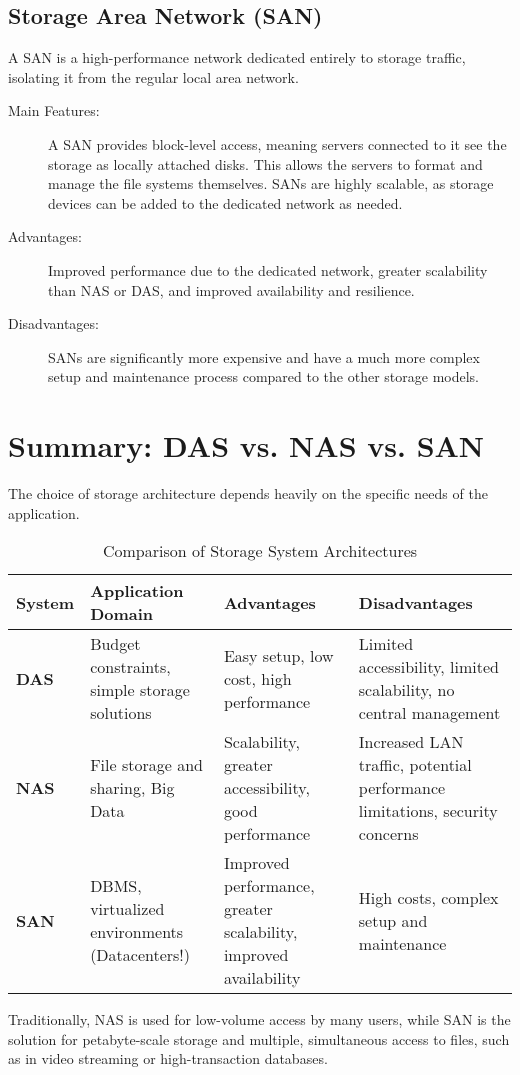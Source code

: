 \subsection{Storage Area Network (SAN)}
A SAN is a high-performance network dedicated entirely to storage traffic, isolating it from the regular local area network.
\begin{description}
    \item[Main Features:] A SAN provides block-level access, meaning servers connected to it see the storage as locally attached disks. This allows the servers to format and manage the file systems themselves. SANs are highly scalable, as storage devices can be added to the dedicated network as needed.
    \item[Advantages:] Improved performance due to the dedicated network, greater scalability than NAS or DAS, and improved availability and resilience.
    \item[Disadvantages:] SANs are significantly more expensive and have a much more complex setup and maintenance process compared to the other storage models.
\end{description}

\section{Summary: DAS vs. NAS vs. SAN}
The choice of storage architecture depends heavily on the specific needs of the application.

\begin{table}[h!]
    \centering
    \begin{tabular}{|p{}|p{}|p{}|p{}|}
        \hline
        \textbf{System} & \textbf{Application Domain} & \textbf{Advantages} & \textbf{Disadvantages} \\
        \hline
        \textbf{DAS} & Budget constraints, simple storage solutions & Easy setup, low cost, high performance & Limited accessibility, limited scalability, no central management \\
        \hline
        \textbf{NAS} & File storage and sharing, Big Data & Scalability, greater accessibility, good performance & Increased LAN traffic, potential performance limitations, security concerns \\
        \hline
        \textbf{SAN} & DBMS, virtualized environments (Datacenters!) & Improved performance, greater scalability, improved availability & High costs, complex setup and maintenance \\
        \hline
    \end{tabular}
    \caption{Comparison of Storage System Architectures}
    \label{tab:storage_comparison}
\end{table}

Traditionally, NAS is used for low-volume access by many users, while SAN is the solution for petabyte-scale storage and multiple, simultaneous access to files, such as in video streaming or high-transaction databases.